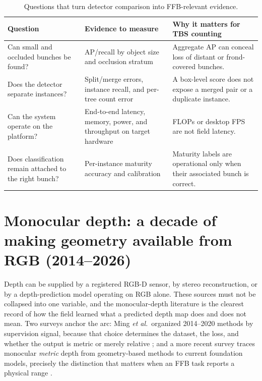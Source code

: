 \begin{table}[t]
\centering\small
\caption{Questions that turn detector comparison into FFB-relevant evidence.}
\label{tab:baseline}
\begin{tabular}{p{}p{}p{}}
\toprule
Question & Evidence to measure & Why it matters for TBS counting \\
\midrule
Can small and occluded bunches be found? & AP/recall by object size and occlusion stratum & Aggregate AP can conceal loss of distant or frond-covered bunches. \\
Does the detector separate instances? & Split/merge errors, instance recall, and per-tree count error & A box-level score does not expose a merged pair or a duplicate instance. \\
Can the system operate on the platform? & End-to-end latency, memory, power, and throughput on target hardware & FLOPs or desktop FPS are not field latency. \\
Does classification remain attached to the right bunch? & Per-instance maturity accuracy and calibration & Maturity labels are operational only when their associated bunch is correct. \\
\bottomrule
\end{tabular}
\end{table}

\section{Monocular depth: a decade of making geometry available from RGB (2014--2026)}

Depth can be supplied by a registered RGB-D sensor, by stereo reconstruction, or by a depth-prediction model operating on RGB alone. These sources must not be collapsed into one variable, and the monocular-depth literature is the clearest record of how the field learned what a predicted depth map does and does not mean. Two surveys anchor the arc: Ming \textit{et al.}\ organized 2014--2020 methods by supervision signal, because that choice determines the dataset, the loss, and whether the output is metric or merely relative \cite{ming2021depthsurvey}; and a more recent survey traces monocular \emph{metric} depth from geometry-based methods to current foundation models, precisely the distinction that matters when an FFB task reports a physical range \cite{zhang2025metricdepthsurvey}.

